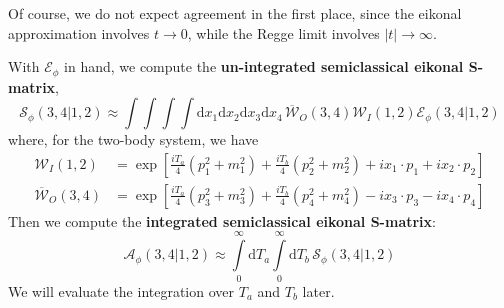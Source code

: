 Of course, we do not expect agreement in the first place, since the eikonal approximation involves $t \rightarrow 0$, while the Regge limit involves $|t| \rightarrow \infty$.

With $\mathcal{E}_{\phi}$ in hand, we compute the \textbf{un-integrated semiclassical eikonal S-matrix},
\begin{equation}
	\mathcal{S}_{\phi}(3, 4|1, 2) \approx \int \int \int \int \mathrm{d}x_{1}\mathrm{d}x_{2}\mathrm{d}x_{3}\mathrm{d}x_{4} \, \overline{\mathcal{W}}_{O}(3, 4) \mathcal{W}_{I}(1, 2) \mathcal{E}_{\phi}(3, 4|1, 2) \label{UnIntegratedSca}
\end{equation}
where, for the two-body system, we have
\begin{align}
	\mathcal{W}_{I}(1, 2) &= \exp{\left[ \frac{i T_{a}}{4}  \left( p_{1}^{2} + m_{1}^{2} \right) + \frac{i T_{b}}{4} \left( p_{2}^{2} + m_{2}^{2} \right) + i x_{1} \cdot p_{1} + i x_{2} \cdot p_{2} \right]} \\
	\overline{\mathcal{W}}_{O}(3, 4) &= \exp{\left[ \frac{i T_{a}}{4} \left( p_{3}^{2} + m_{3}^{2} \right) + \frac{i T_{b}}{4} \left( p_{4}^{2} + m_{4}^{2} \right) -i x_{3} \cdot p_{3} - i x_{4} \cdot p_{4} \right]}
\end{align}
Then we compute the \textbf{integrated semiclassical eikonal S-matrix}:
\begin{equation}
	\mathcal{A}_{\phi}(3,4|1,2) \approx \int\limits_{0}^{\infty} \mathrm{d}T_{a} \int\limits_{0}^{\infty} \mathrm{d}T_{b} \, \mathcal{S}_{\phi}(3,4|1,2) \label{IntegratedSca}
\end{equation}
We will evaluate the integration over $T_{a}$ and $T_{b}$ later.


